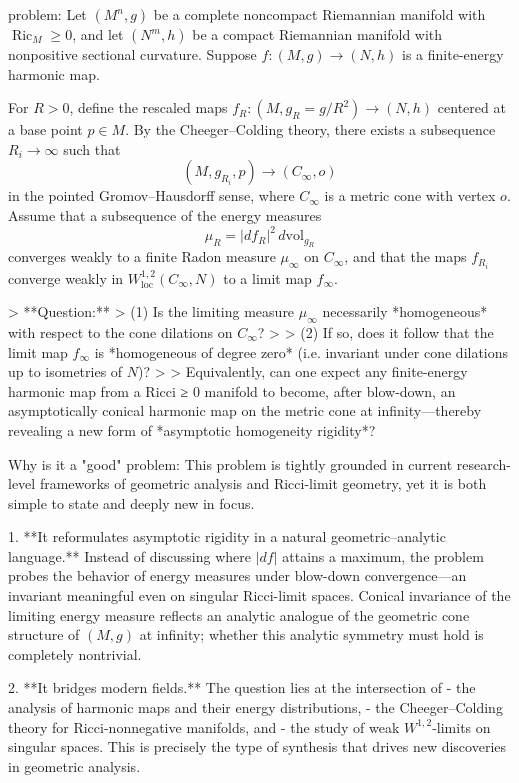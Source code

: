 problem:  
Let \((M^n,g)\) be a complete noncompact Riemannian manifold with \(\operatorname{Ric}_M \ge 0\), and let \((N^m,h)\) be a compact Riemannian manifold with nonpositive sectional curvature.  
Suppose \(f:(M,g)\to (N,h)\) is a finite-energy harmonic map.  

For \(R>0\), define the rescaled maps \(f_R:(M,g_R=g/R^2)\to(N,h)\) centered at a base point \(p\in M\).  
By the Cheeger–Colding theory, there exists a subsequence \(R_i\to\infty\) such that  
\[
(M,g_{R_i},p)\longrightarrow (C_\infty,o)
\]
in the pointed Gromov–Hausdorff sense, where \(C_\infty\) is a metric cone with vertex \(o\).  
Assume that a subsequence of the energy measures
\[
\mu_R = |df_R|^2\, d\mathrm{vol}_{g_R}
\]
converges weakly to a finite Radon measure \(\mu_\infty\) on \(C_\infty\), and that the maps \(f_{R_i}\) converge weakly in \(W^{1,2}_{\mathrm{loc}}(C_\infty,N)\) to a limit map \(f_\infty\).  

> **Question:**  
> (1) Is the limiting measure \(\mu_\infty\) necessarily *homogeneous* with respect to the cone dilations on \(C_\infty\)?  
>  
> (2) If so, does it follow that the limit map \(f_\infty\) is *homogeneous of degree zero* (i.e. invariant under cone dilations up to isometries of \(N\))?  
>  
> Equivalently, can one expect any finite-energy harmonic map from a Ricci ≥ 0 manifold to become, after blow-down, an asymptotically conical harmonic map on the metric cone at infinity—thereby revealing a new form of *asymptotic homogeneity rigidity*?

Why is it a "good" problem:  
This problem is tightly grounded in current research-level frameworks of geometric analysis and Ricci-limit geometry, yet it is both simple to state and deeply new in focus.  

1. **It reformulates asymptotic rigidity in a natural geometric–analytic language.**  
   Instead of discussing where \(|df|\) attains a maximum, the problem probes the behavior of energy measures under blow-down convergence—an invariant meaningful even on singular Ricci-limit spaces. Conical invariance of the limiting energy measure reflects an analytic analogue of the geometric cone structure of \((M,g)\) at infinity; whether this analytic symmetry must hold is completely nontrivial.

2. **It bridges modern fields.**  
   The question lies at the intersection of  
   - the analysis of harmonic maps and their energy distributions,  
   - the Cheeger–Colding theory for Ricci-nonnegative manifolds, and  
   - the study of weak \(W^{1,2}\)-limits on singular spaces.  
   This is precisely the type of synthesis that drives new discoveries in geometric analysis.  

